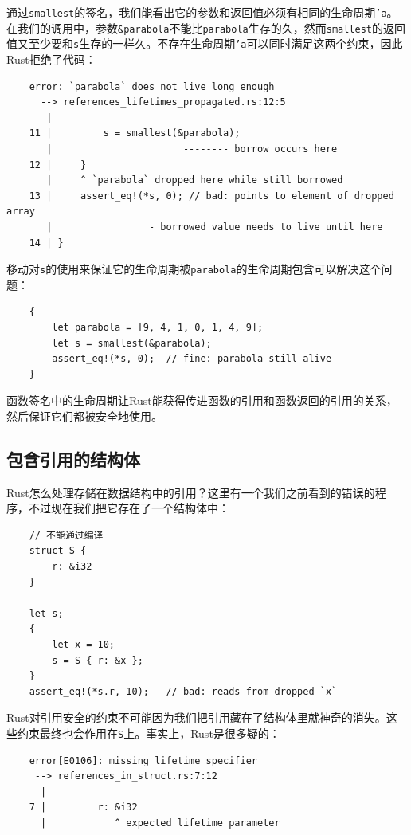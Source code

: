 通过\texttt{smallest}的签名，我们能看出它的参数和返回值必须有相同的生命周期\texttt{'a}。在我们的调用中，参数\texttt{\&parabola}不能比\texttt{parabola}生存的久，然而\texttt{smallest}的返回值又至少要和\texttt{s}生存的一样久。不存在生命周期\texttt{'a}可以同时满足这两个约束，因此Rust拒绝了代码：
\begin{verbatim}
    error: `parabola` does not live long enough
      --> references_lifetimes_propagated.rs:12:5
       |
    11 |         s = smallest(&parabola);
       |                       -------- borrow occurs here
    12 |     }
       |     ^ `parabola` dropped here while still borrowed
    13 |     assert_eq!(*s, 0); // bad: points to element of dropped array
       |                 - borrowed value needs to live until here
    14 | }
\end{verbatim}

移动对\texttt{s}的使用来保证它的生命周期被\texttt{parabola}的生命周期包含可以解决这个问题：
\begin{verbatim}
    {
        let parabola = [9, 4, 1, 0, 1, 4, 9];
        let s = smallest(&parabola);
        assert_eq!(*s, 0);  // fine: parabola still alive
    }
\end{verbatim}

函数签名中的生命周期让Rust能获得传进函数的引用和函数返回的引用的关系，然后保证它们都被安全地使用。

\subsection{包含引用的结构体}\label{refstruct}

Rust怎么处理存储在数据结构中的引用？这里有一个我们之前看到的错误的程序，不过现在我们把它存在了一个结构体中：
\begin{verbatim}
    // 不能通过编译
    struct S {
        r: &i32
    }
    
    let s;
    {
        let x = 10;
        s = S { r: &x };
    }
    assert_eq!(*s.r, 10);   // bad: reads from dropped `x`
\end{verbatim}

Rust对引用安全的约束不可能因为我们把引用藏在了结构体里就神奇的消失。这些约束最终也会作用在\texttt{S}上。事实上，Rust是很多疑的：
\begin{verbatim}
    error[E0106]: missing lifetime specifier
     --> references_in_struct.rs:7:12
      |
    7 |         r: &i32
      |            ^ expected lifetime parameter
\end{verbatim}

